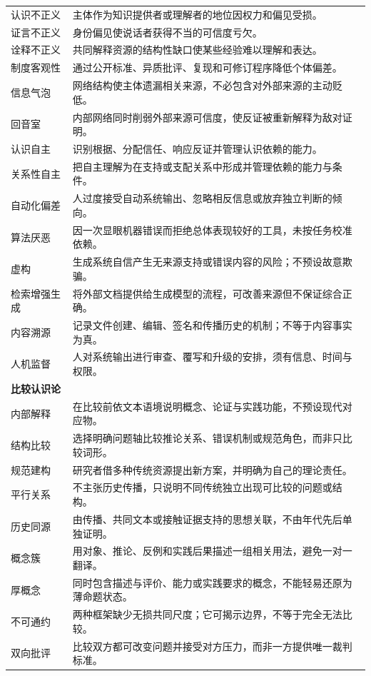 \begin{longtable}{p{}p{}}
认识不正义 & 主体作为知识提供者或理解者的地位因权力和偏见受损。\\
证言不正义 & 身份偏见使说话者获得不当的可信度亏欠。\\
诠释不正义 & 共同解释资源的结构性缺口使某些经验难以理解和表达。\\
制度客观性 & 通过公开标准、异质批评、复现和可修订程序降低个体偏差。\\
信息气泡 & 网络结构使主体遗漏相关来源，不必包含对外部来源的主动贬低。\\
回音室 & 内部网络同时削弱外部来源可信度，使反证被重新解释为敌对证明。\\
认识自主 & 识别根据、分配信任、响应反证并管理认识依赖的能力。\\
关系性自主 & 把自主理解为在支持或支配关系中形成并管理依赖的能力与条件。\\
自动化偏差 & 人过度接受自动系统输出、忽略相反信息或放弃独立判断的倾向。\\
算法厌恶 & 因一次显眼机器错误而拒绝总体表现较好的工具，未按任务校准依赖。\\
虚构 & 生成系统自信产生无来源支持或错误内容的风险；不预设故意欺骗。\\
检索增强生成 & 将外部文档提供给生成模型的流程，可改善来源但不保证综合正确。\\
内容溯源 & 记录文件创建、编辑、签名和传播历史的机制；不等于内容事实为真。\\
人机监督 & 人对系统输出进行审查、覆写和升级的安排，须有信息、时间与权限。\\
\multicolumn{2}{l}{\textbf{比较认识论}}\\
内部解释 & 在比较前依文本语境说明概念、论证与实践功能，不预设现代对应物。\\
结构比较 & 选择明确问题轴比较推论关系、错误机制或规范角色，而非只比较词形。\\
规范建构 & 研究者借多种传统资源提出新方案，并明确为自己的理论责任。\\
平行关系 & 不主张历史传播，只说明不同传统独立出现可比较的问题或结构。\\
历史同源 & 由传播、共同文本或接触证据支持的思想关联，不由年代先后单独证明。\\
概念簇 & 用对象、推论、反例和实践后果描述一组相关用法，避免一对一翻译。\\
厚概念 & 同时包含描述与评价、能力或实践要求的概念，不能轻易还原为薄命题状态。\\
不可通约 & 两种框架缺少无损共同尺度；它可揭示边界，不等于完全无法比较。\\
双向批评 & 比较双方都可改变问题并接受对方压力，而非一方提供唯一裁判标准。\\
\bottomrule
\end{longtable}
